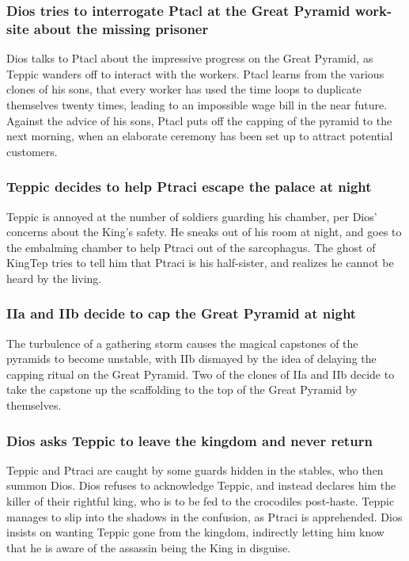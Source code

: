 \subsubsection{\Gls{Dios} tries to interrogate \Gls{Ptacl} at the Great Pyramid work-site about the
    missing prisoner}
\Gls{Dios} talks to \Gls{Ptacl} about the impressive progress on the Great Pyramid, as \Gls{Teppic}
wanders off to interact with the workers. \Gls{Ptacl} learns from the various clones of his sons,
that every worker has used the time loops to duplicate themselves twenty times, leading to an
impossible wage bill in the near future. Against the advice of his sons, \Gls{Ptacl} puts off the
capping of the pyramid to the next morning, when an elaborate ceremony has been set up to attract
potential customers.

\subsubsection{\Gls{Teppic} decides to help \Gls{Ptraci} escape the palace at night}
\Gls{Teppic} is annoyed at the number of soldiers guarding his chamber, per \Gls{Dios}' concerns
about the King's safety. He sneaks out of his room at night, and goes to the embalming chamber to
help \Gls{Ptraci} out of the sarcophagus. The ghost of \Gls{KingTep} tries to tell him that
\Gls{Ptraci} is his half-sister, and realizes he cannot be heard by the living.

\subsubsection{\Gls{IIa} and \Gls{IIb} decide to cap the Great Pyramid at night}
The turbulence of a gathering storm causes the magical capstones of the pyramids to become unstable,
with \Gls{IIb} dismayed by the idea of delaying the capping ritual on the Great Pyramid. Two of the
clones of \Gls{IIa} and \Gls{IIb} decide to take the capstone up the scaffolding to the top of the
Great Pyramid by themselves.

\subsubsection{\Gls{Dios} asks \Gls{Teppic} to leave the kingdom and never return}
\Gls{Teppic} and \Gls{Ptraci} are caught by some guards hidden in the stables, who then summon
\Gls{Dios}. \Gls{Dios} refuses to acknowledge \Gls{Teppic}, and instead declares him the killer of
their rightful king, who is to be fed to the crocodiles post-haste. \Gls{Teppic} manages to slip
into the shadows in the confusion, as \Gls{Ptraci} is apprehended. \Gls{Dios} insists on wanting
\Gls{Teppic} gone from the kingdom, indirectly letting him know that he is aware of the assassin
being the King in disguise.

